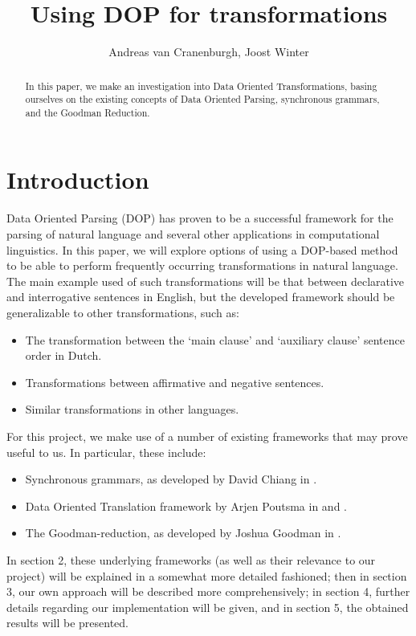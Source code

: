 \documentclass[a4paper]{article}
\theoremstyle{definition}
\begin{document}
\title{Using DOP for transformations}
\author{Andreas van Cranenburgh, Joost Winter}
\maketitle

\begin{abstract}
In this paper, we make an investigation into Data Oriented Transformations, basing ourselves on the existing concepts of Data Oriented Parsing, synchronous grammars, and the Goodman Reduction.
\end{abstract}

\section{Introduction}

Data Oriented Parsing (DOP) has proven to be a successful framework for the parsing of natural language and several other applications in computational linguistics. In this paper, we will explore options of using a DOP-based method to be able to perform frequently occurring transformations in natural language. The main example used of such transformations will be that between declarative and interrogative sentences in English, but the developed framework should be generalizable to other transformations, such as:
\begin{itemize}
\item The transformation between the `main clause' and `auxiliary clause' sentence order in Dutch.
\item Transformations between affirmative and negative sentences.
\item Similar transformations in other languages.
\end{itemize}

For this project, we make use of a number of existing frameworks that may prove useful to us. In particular, these include:
\begin{itemize}
\item Synchronous grammars, as developed by David Chiang in \cite{Ch}.
\item Data Oriented Translation framework by Arjen Poutsma in \cite{Po} and \cite{Po2}.
\item The Goodman-reduction, as developed by Joshua Goodman in \cite{Go}.
\end{itemize}

In section 2, these underlying frameworks (as well as their relevance to our project) will be explained in a somewhat more detailed fashioned; then in section 3, our own approach will be described more comprehensively; in section 4, further details regarding our implementation will be given, and in section 5, the obtained results will be presented.
\end{document}
